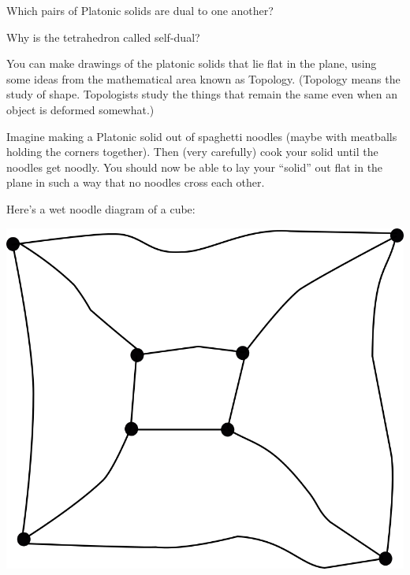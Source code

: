 Which pairs of Platonic solids are dual to one another?

\wbvfill

Why is the tetrahedron called self-dual?

\wbvfill

You can make drawings of the platonic solids that lie flat in the plane, using some ideas from the mathematical area known as Topology.
(Topology means the study of shape.  Topologists study the things that remain the same even when an object is deformed somewhat.)

Imagine making a Platonic solid out of spaghetti noodles (maybe with meatballs holding the corners together).  Then (very carefully) cook your solid until the noodles get noodly. You should now be able to lay your ``solid'' out flat in the plane in such a way that no noodles cross each other.

Here's a wet noodle diagram of a cube:

\centerline{\includegraphics[scale=.5]{images/wet_noodle_cube.png}}

\wbnewpage

